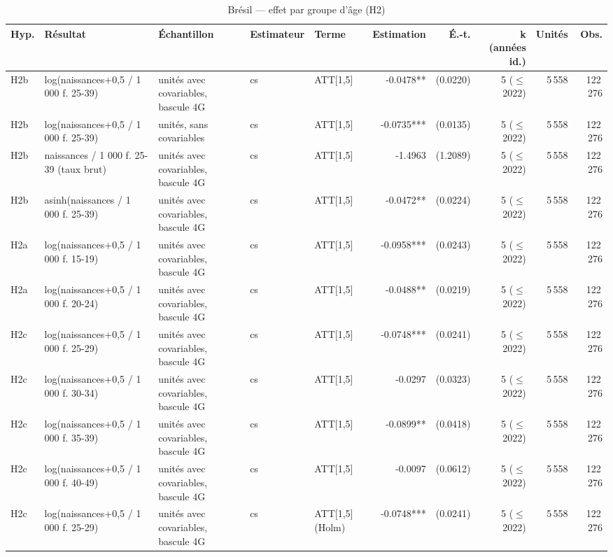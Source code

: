 \begin{table}\centering
\begin{threeparttable}
\caption{Brésil — effet par groupe d'âge (H2)}\label{tab:br_h2age}
\scriptsize
\begin{tabular}{lp{4.4cm}p{5.7cm}lp{3.9cm}rrrrr}
\toprule
Hyp. & Résultat & Échantillon & Estimateur & Terme & Estimation & É.-t. & k (années id.) & Unités & Obs. \\
\midrule
H2b & log(naissances+0,5 / 1 000 f. 25-39) & unités avec covariables, bascule 4G & cs & ATT[1,5] & -0.0478** & (0.0220) & 5 ($\leq$ 2022) & 5\,558 & 122\,276 \\
H2b & log(naissances+0,5 / 1 000 f. 25-39) & unités, sans covariables & cs & ATT[1,5] & -0.0735*** & (0.0135) & 5 ($\leq$ 2022) & 5\,558 & 122\,276 \\
H2b & naissances / 1 000 f. 25-39 (taux brut) & unités avec covariables, bascule 4G & cs & ATT[1,5] & -1.4963 & (1.2089) & 5 ($\leq$ 2022) & 5\,558 & 122\,276 \\
H2b & asinh(naissances / 1 000 f. 25-39) & unités avec covariables, bascule 4G & cs & ATT[1,5] & -0.0472** & (0.0224) & 5 ($\leq$ 2022) & 5\,558 & 122\,276 \\
H2a & log(naissances+0,5 / 1 000 f. 15-19) & unités avec covariables, bascule 4G & cs & ATT[1,5] & -0.0958*** & (0.0243) & 5 ($\leq$ 2022) & 5\,558 & 122\,276 \\
H2a & log(naissances+0,5 / 1 000 f. 20-24) & unités avec covariables, bascule 4G & cs & ATT[1,5] & -0.0488** & (0.0219) & 5 ($\leq$ 2022) & 5\,558 & 122\,276 \\
H2c & log(naissances+0,5 / 1 000 f. 25-29) & unités avec covariables, bascule 4G & cs & ATT[1,5] & -0.0748*** & (0.0241) & 5 ($\leq$ 2022) & 5\,558 & 122\,276 \\
H2c & log(naissances+0,5 / 1 000 f. 30-34) & unités avec covariables, bascule 4G & cs & ATT[1,5] & -0.0297 & (0.0323) & 5 ($\leq$ 2022) & 5\,558 & 122\,276 \\
H2c & log(naissances+0,5 / 1 000 f. 35-39) & unités avec covariables, bascule 4G & cs & ATT[1,5] & -0.0899** & (0.0418) & 5 ($\leq$ 2022) & 5\,558 & 122\,276 \\
H2c & log(naissances+0,5 / 1 000 f. 40-49) & unités avec covariables, bascule 4G & cs & ATT[1,5] & -0.0097 & (0.0612) & 5 ($\leq$ 2022) & 5\,558 & 122\,276 \\
H2c & log(naissances+0,5 / 1 000 f. 25-29) & unités avec covariables, bascule 4G & cs & ATT[1,5] (Holm) & -0.0748*** & (0.0241) & 5 ($\leq$ 2022) & 5\,558 & 122\,276 \\

\end{tabular}
\end{threeparttable}
\end{table}
